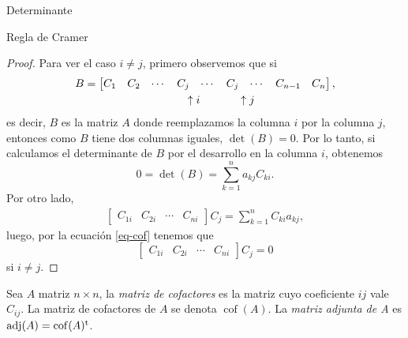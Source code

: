 \begin{chapter}{Determinante}
\begin{section}{Regla de Cramer}
\begin{proof}
        Para ver el caso $i \ne j$, primero observemos que si
        \begin{align*}
            B & = \begin{bmatrix} C_1 & C_2&\cdots &C_j& \cdots &C_j & \cdots &C_{n-1}& C_{n}\end{bmatrix}, \\
              & \hspace{3.2cm} \uparrow i \hspace{1.2cm} \uparrow j
        \end{align*}
        es decir, $B$ es la matriz $A$ donde reemplazamos la columna $i$ por la columna $j$, entonces como $B$ tiene dos columnas iguales, $\det(B) =0$. Por lo tanto, si calculamos el determinante de $B$ por el desarrollo en la columna $i$, obtenemos
        \begin{equation} \label{eq-cof}
            0 = \det(B) = \sum_{k=1}^{n} a_{kj}C_{ki}.
        \end{equation}
        Por otro lado,
        \begin{align*}
            \begin{bmatrix} C_{1i} & C_{2i} & \cdots & C_{ni}\end{bmatrix} C_j = \sum_{k=1}^{n} C_{ki}a_{kj},
        \end{align*}
        luego, por la ecuación \eqref{eq-cof} tenemos que
        $$
            \begin{bmatrix} C_{1i} & C_{2i} & \cdots & C_{ni}\end{bmatrix} C_j =0
        $$
        si $i \ne j$.

    \end{proof}

    \begin{definicion} Sea $A$ matriz $n \times n$, la \textit{matriz de cofactores} es la matriz cuyo coeficiente $ij$ vale $C_{ij}$. La matriz de cofactores de $A$  se denota $\operatorname{cof}(A)$. La \textit{matriz adjunta de A} es $\operatorname{adj}(A) = \operatorname{cof}(A)^{\operatorname{t}}$.
    \end{definicion}


\end{section}
\end{chapter}
